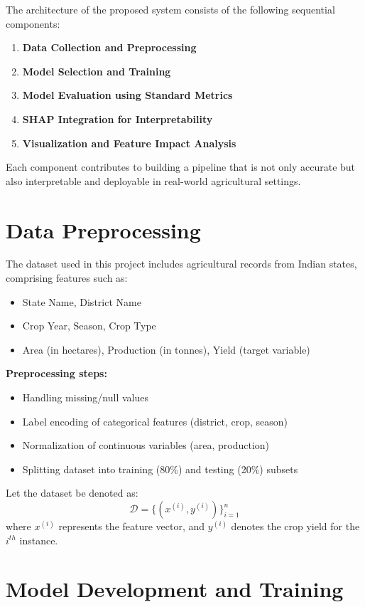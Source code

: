 \documentclass[a4paper,11pt,oneside]{book}
\begin{document}
The architecture of the proposed system consists of the following sequential components:

\begin{enumerate}
    \item \textbf{Data Collection and Preprocessing}
    \item \textbf{Model Selection and Training}
    \item \textbf{Model Evaluation using Standard Metrics}
    \item \textbf{SHAP Integration for Interpretability}
    \item \textbf{Visualization and Feature Impact Analysis}
\end{enumerate}

Each component contributes to building a pipeline that is not only accurate but also interpretable and deployable in real-world agricultural settings.

\section{Data Preprocessing}

The dataset used in this project includes agricultural records from Indian states, comprising features such as:

\begin{itemize}
    \item State Name, District Name
    \item Crop Year, Season, Crop Type
    \item Area (in hectares), Production (in tonnes), Yield (target variable)
\end{itemize}

\textbf{Preprocessing steps:}
\begin{itemize}
    \item Handling missing/null values
    \item Label encoding of categorical features (district, crop, season)
    \item Normalization of continuous variables (area, production)
    \item Splitting dataset into training (80\%) and testing (20\%) subsets
\end{itemize}

Let the dataset be denoted as:
\[
\mathcal{D} = \{(x^{(i)}, y^{(i)})\}_{i=1}^n
\]
where \(x^{(i)}\) represents the feature vector, and \(y^{(i)}\) denotes the crop yield for the \(i^{th}\) instance.

\section{Model Development and Training}
\end{document}
